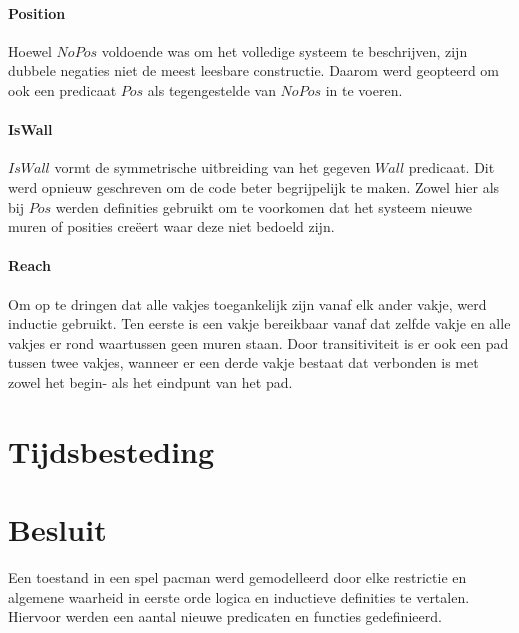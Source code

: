 \documentclass[a4paper,12pt]{article}
\begin{document}
\paragraph{Position}
Hoewel $NoPos$ voldoende was om het volledige systeem te beschrij\-ven, zijn dubbele negaties niet de meest leesbare constructie.
Daarom werd geopteerd om ook een predicaat $Pos$ als tegengestelde van $NoPos$ in te voe\-ren.

\paragraph{IsWall}
$IsWall$ vormt de symmetrische uitbreiding van het gegeven $Wall$ predicaat. Dit werd opnieuw geschreven om de code beter begrijpelijk te maken.
Zowel hier als bij $Pos$ werden definities gebruikt om te voorkomen dat het systeem nieuwe muren of posities cre\"eert waar deze niet bedoeld zijn.
\paragraph{Reach}
Om op te dringen dat alle vakjes toegankelijk zijn vanaf elk ander vakje, werd inductie gebruikt. Ten eerste is een vakje bereikbaar vanaf dat zelfde vakje en alle vakjes er rond waartussen geen muren staan. Door transitiviteit is er ook een pad tussen twee vakjes, wanneer er een derde vakje bestaat dat verbonden is met zowel het begin- als het eindpunt van het pad.

\section{Tijdsbesteding}

\section{Besluit}
Een toestand in een spel pacman werd gemodelleerd door elke restrictie en algemene waarheid in eerste orde logica en inductieve definities te vertalen. Hiervoor werden een aantal nieuwe predicaten en functies gedefinieerd.
\end{document}
